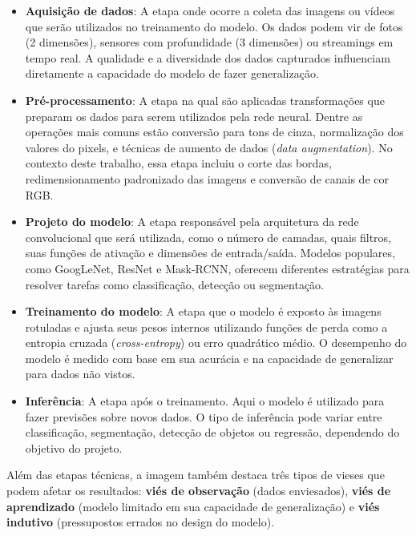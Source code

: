 \begin{itemize}
    \item \textbf{Aquisição de dados}: A etapa onde ocorre a coleta das imagens ou vídeos que serão utilizados no 
    treinamento do modelo. Os dados podem vir de fotos (2 dimensões), sensores com profundidade (3 dimensões) ou 
    streamings em tempo real. A qualidade e a diversidade dos dados capturados influenciam diretamente a capacidade 
    do modelo de fazer generalização.

    \item \textbf{Pré-processamento}: A etapa na qual são aplicadas transformações que preparam os dados para serem 
    utilizados pela rede neural. Dentre as operações mais comuns estão conversão para tons de cinza, normalização 
    dos valores do pixels, e técnicas de aumento de dados (\textit{data augmentation}). No contexto deste trabalho, 
    essa etapa incluiu o corte das bordas, redimensionamento padronizado das imagens e conversão de canais de cor RGB.

    \item \textbf{Projeto do modelo}: A etapa responsável pela arquitetura da rede convolucional que será utilizada, 
    como o número de camadas, quais filtros, suas funções de ativação e dimensões de entrada/saída. Modelos populares, 
    como GoogLeNet, ResNet e Mask-RCNN, oferecem diferentes estratégias para resolver tarefas como classificação, 
    detecção ou segmentação.

    \item \textbf{Treinamento do modelo}: A etapa que o modelo é exposto às imagens rotuladas e ajusta seus pesos 
    internos utilizando funções de perda como a entropia cruzada (\textit{cross-entropy}) ou erro quadrático médio. 
    O desempenho do modelo é medido com base em sua acurácia e na capacidade de generalizar para dados não vistos.

    \item \textbf{Inferência}: A etapa após o treinamento. Aqui o modelo é utilizado para fazer previsões sobre novos dados. 
    O tipo de inferência pode variar entre classificação, segmentação, detecção de objetos ou regressão, dependendo 
    do objetivo do projeto.

\end{itemize}

Além das etapas técnicas, a imagem também destaca três tipos de vieses que podem afetar os resultados:
\textbf{viés de observação} (dados enviesados), \textbf{viés de aprendizado} (modelo limitado em sua capacidade de 
generalização) e \textbf{viés indutivo} (pressupostos errados no design do modelo).

